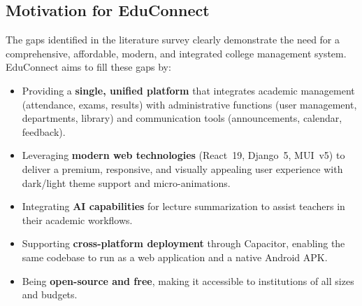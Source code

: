 \subsection{Motivation for EduConnect}

The gaps identified in the literature survey clearly demonstrate the need for a comprehensive, affordable, modern, and integrated college management system. EduConnect aims to fill these gaps by:

\begin{itemize}[leftmargin=2em]
    \item Providing a \textbf{single, unified platform} that integrates academic management (attendance, exams, results) with administrative functions (user management, departments, library) and communication tools (announcements, calendar, feedback).
    
    \item Leveraging \textbf{modern web technologies} (React~19, Django~5, MUI~v5) to deliver a premium, responsive, and visually appealing user experience with dark/light theme support and micro-animations.
    
    \item Integrating \textbf{AI capabilities} for lecture summarization to assist teachers in their academic workflows.
    
    \item Supporting \textbf{cross-platform deployment} through Capacitor, enabling the same codebase to run as a web application and a native Android APK.
    
    \item Being \textbf{open-source and free}, making it accessible to institutions of all sizes and budgets.
\end{itemize}